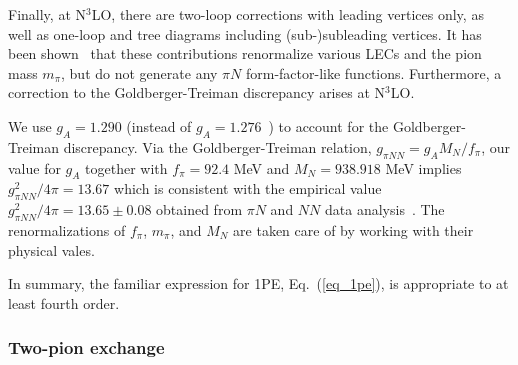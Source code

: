 \documentclass[sort&compress,preprint,3p]{elsarticle}
\begin{document}
Finally, at N$^3$LO, there are two-loop corrections with
leading vertices only, as well as one-loop and
tree diagrams including (sub-)subleading vertices.
It has been shown~\cite{KBW97,Kai00a} that these contributions
renormalize various LECs and the pion mass $m_\pi$,
but do not generate any $\pi N$ form-factor-like functions.
Furthermore, a correction to the 
Goldberger-Treiman discrepancy arises at N$^3$LO.

We use $g_A=1.290$ (instead of $g_A=1.276$~\cite{Liu10})
to account for the Goldberger-Treiman discrepancy. 
Via the Goldberger-Treiman relation,
$g_{\pi NN} =
 g_A  M_N/f_\pi$, 
our value for $g_A$ 
together with $f_\pi=92.4$ MeV and $M_N=938.918$ MeV
implies
$g_{\pi NN}^2/4\pi = 13.67$
which is consistent with the empirical value
$g_{\pi NN}^2/4\pi = 13.65\pm 0.08$
obtained from $\pi N$ and $NN$ 
data analysis~\cite{AWP94,STS93}.
The renormalizations of $f_\pi$, $m_\pi$, and $M_N$
are taken care of by working with their physical
vales.

In summary, the familiar expression for 1PE,
Eq.~(\ref{eq_1pe}),
is appropriate to at least fourth order.



\subsubsection{Two-pion exchange \label{sec_2pi}}
\end{document}
